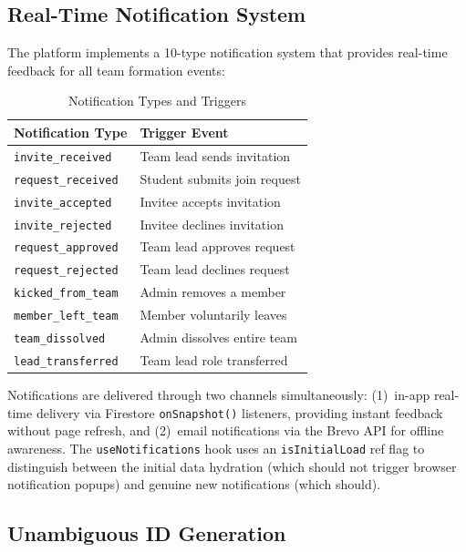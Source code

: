 \documentclass[conference]{IEEEtran}
\begin{document}
\subsection{Real-Time Notification System}

The platform implements a 10-type notification system that provides real-time feedback for all team formation events:

\begin{table}[htbp]
\centering
\caption{Notification Types and Triggers}
\label{tab:notiftypes}
\footnotesize
\renewcommand{\arraystretch}{1.1}
\begin{tabular}{@{}ll@{}}
\toprule
\textbf{Notification Type} & \textbf{Trigger Event} \\
\midrule
\texttt{invite\_received} & Team lead sends invitation \\
\texttt{request\_received} & Student submits join request \\
\texttt{invite\_accepted} & Invitee accepts invitation \\
\texttt{invite\_rejected} & Invitee declines invitation \\
\texttt{request\_approved} & Team lead approves request \\
\texttt{request\_rejected} & Team lead declines request \\
\texttt{kicked\_from\_team} & Admin removes a member \\
\texttt{member\_left\_team} & Member voluntarily leaves \\
\texttt{team\_dissolved} & Admin dissolves entire team \\
\texttt{lead\_transferred} & Team lead role transferred \\
\bottomrule
\end{tabular}
\end{table}

Notifications are delivered through two channels simultaneously: (1)~in-app real-time delivery via Firestore \texttt{onSnapshot()} listeners, providing instant feedback without page refresh, and (2)~email notifications via the Brevo API for offline awareness. The \texttt{useNotifications} hook uses an \texttt{isInitialLoad} ref flag to distinguish between the initial data hydration (which should not trigger browser notification popups) and genuine new notifications (which should).

\subsection{Unambiguous ID Generation}
\end{document}
